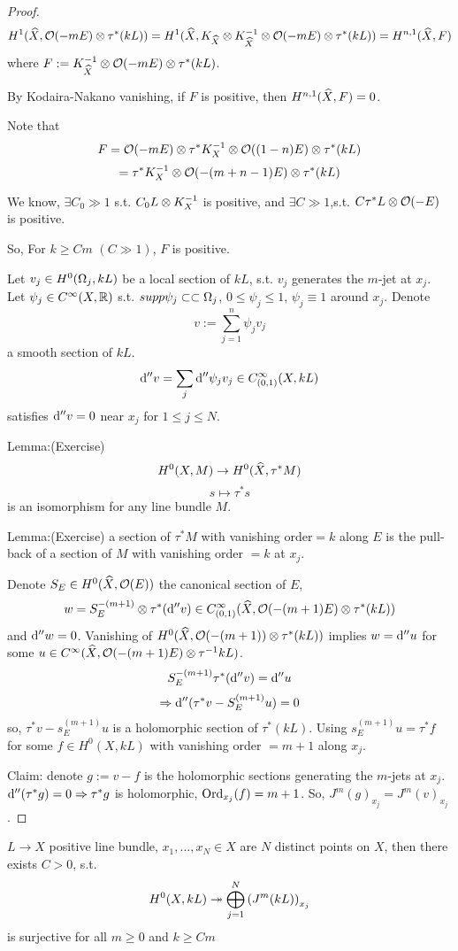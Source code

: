 \begin{proof}
$$
  H^1(\widehat{X},\mathcal{O}(-mE)\otimes\tau^*(kL))
=
  H^1(\widehat{X},K_{\widehat{X}}\otimes K^{-1}_{\widehat{X}}\otimes\mathcal{O}(-mE)\otimes\tau^*(kL))
=
  H^{n,1}(\widehat{X},F)
$$
where $F:= K^{-1}_{\widehat{X}}\otimes\mathcal{O}(-mE)\otimes\tau^*(kL)$.

By Kodaira-Nakano vanishing, if $F$ is positive,
then $H^{n,1}(\widehat{X},F)=0$.

Note that
$$F=\mathcal{O}(-mE)\otimes\tau^*K_X^{-1}\otimes\mathcal{O}((1-n)E)\otimes\tau^*(kL)$$
$$=\tau^*K_X^{-1}\otimes\mathcal{O}(-(m+n-1)E)\otimes\tau^*(kL)$$

We know, $\exists C_0\gg 1$ s.t. $C_0L\otimes K_X^{-1}$ is positive,
and $\exists C\gg 1$,s.t. $C\tau^*L\otimes\mathcal{O}(-E)$ is positive.

So, For $k\geq Cm\,\,(C\gg 1)$, $F$ is positive.

Let $v_j\in H^0(\Omega_j,kL)$ be a local section of $kL$,
s.t. $v_j$ generates the $m$-jet at $x_j$. Let
$\psi_j\in C^\infty(X,\mathbb{R})$ s.t. $supp\psi_j\subset\subset\Omega_j$,
$0\leq\psi_j\leq 1$, $\psi_j\equiv 1$ around $x_j$. Denote
$$
  v:=\sum_{j=1}^{n}
    \psi_jv_j
$$
a smooth section of $kL$.
$$
  \mathrm{d}''v=\sum_{j}\mathrm{d}''\psi_jv_j\in C_{(0,1)}^{\infty}(X,kL)
$$
satisfies $\mathrm{d}''v=0$ near $x_j$ for $1\leq j\leq N$.

Lemma:(Exercise)
$$H^0(X,M)\to H^0(\widehat{X},\tau^*M)$$
$$s\mapsto\tau^*s$$
is an isomorphism for any line bundle $M$.

Lemma:(Exercise)
a section of $\tau^*M$ with vanishing order$=k$ along $E$ is the
pull-back of a section of $M$ with vanishing order $=k$ at $x_j$.
\vs

Denote $S_E\in H^0(\widehat{X},\mathcal{O}(E))$ the canonical section of $E$,
$$
  w=S_E^{-(m+1)}\otimes\tau^*(\mathrm{d}''v)\in
  C_{(0,1)}^{\infty}
  (\widehat{X},\mathcal{O}(-(m+1)E)\otimes\tau^*(kL))
$$
and $\mathrm{d}''w=0$. Vanishing of $H^0(\widehat{X},\mathcal{O}(-(m+1))\otimes\tau^*(kL))$
implies $w=\mathrm{d}'' u$ for some $u\in C^\infty(\widehat{X},\mathcal{O}(-(m+1)E)\otimes\tau^{-1}kL)$.
$$S_E^{-(m+1)}\tau^*(\mathrm{d}''v)=\mathrm{d}''u$$
$$\Rightarrow\mathrm{d}''(\tau^*v-S_E^{(m+1)}u)=0$$
so, $\tau^*v-s_E^{(m+1)}u$ is a holomorphic section of $\tau^*(kL)$.
Using $s_E^{(m+1)}u=\tau^*f$ for some $f\in H^0(X,kL)$ with vanishing order
$= m+1$ along $x_j$.

Claim: denote $g:= v-f$ is the holomorphic sections generating
the $m$-jets at $x_j$. $\mathrm{d}''(\tau^*g)=0\Rightarrow\tau^*g$ is holomorphic,
$\operatorname{Ord}_{x_j}(f)=m+1$. So, $J^m(g)_{x_j}=J^m(v)_{x_j}$.

\end{proof}

\begin{thm} $L\to X$ positive line bundle, $x_1,...,x_N\in X$
are $N$ distinct points on $X$, then there exists $C>0$, s.t.
$$
  H^0(X,kL)\twoheadrightarrow\bigoplus_{j=1}^N
  \left(
    J^m(kL)
  \right)_{x_j}
$$
is surjective for all $m\geq 0$ and $k\geq Cm$
\end{thm}

